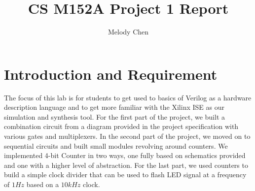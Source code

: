 \documentclass{article}
\title{\vspace{-2.0cm}CS M152A Project 1 Report}
\author{Melody Chen}
\begin{document}
\maketitle
\section{Introduction and Requirement} 
The focus of this lab is for students to get used to basics of Verilog as a hardware description language and to get more familiar with the Xilinx ISE as our simulation and synthesis tool. For the first part of the project, we built a combination circuit from a diagram provided in the project specification with various gates and multiplexers. In the second part of the project, we moved on to sequential circuits and built small modules revolving around counters. We implemented 4-bit Counter in two ways, one fully based on schematics provided and one with a higher level of abstraction. For the last part, we used counters to build a simple clock divider that can be used to flash LED signal at a frequency of $1Hz$ based on a $10kHz$ clock.
\end{document}
